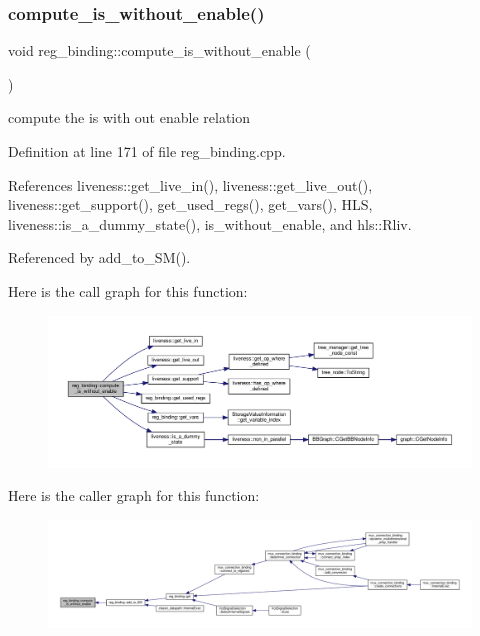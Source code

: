 \subsubsection{\texorpdfstring{compute\+\_\+is\+\_\+without\+\_\+enable()}{compute\_is\_without\_enable()}}
{\footnotesize\ttfamily void reg\+\_\+binding\+::compute\+\_\+is\+\_\+without\+\_\+enable (\begin{DoxyParamCaption}{ }\end{DoxyParamCaption})\hspace{0.3cm}{\ttfamily [protected]}}



compute the is with out enable relation 



Definition at line 171 of file reg\+\_\+binding.\+cpp.



References liveness\+::get\+\_\+live\+\_\+in(), liveness\+::get\+\_\+live\+\_\+out(), liveness\+::get\+\_\+support(), get\+\_\+used\+\_\+regs(), get\+\_\+vars(), H\+LS, liveness\+::is\+\_\+a\+\_\+dummy\+\_\+state(), is\+\_\+without\+\_\+enable, and hls\+::\+Rliv.



Referenced by add\+\_\+to\+\_\+\+S\+M().

Here is the call graph for this function\+:
\nopagebreak
\begin{figure}[H]
\begin{center}
\leavevmode
\includegraphics[width=350pt]{da/d7c/classreg__binding_ad6fd4336ceaa2e65955560fed8e0d41b_cgraph}
\end{center}
\end{figure}
Here is the caller graph for this function\+:
\nopagebreak
\begin{figure}[H]
\begin{center}
\leavevmode
\includegraphics[width=350pt]{da/d7c/classreg__binding_ad6fd4336ceaa2e65955560fed8e0d41b_icgraph}
\end{center}
\end{figure}
\mbox{\label{classreg__binding_a80abb6a0e0eec2dbfbb4e4a8b6b0eda7}} 

